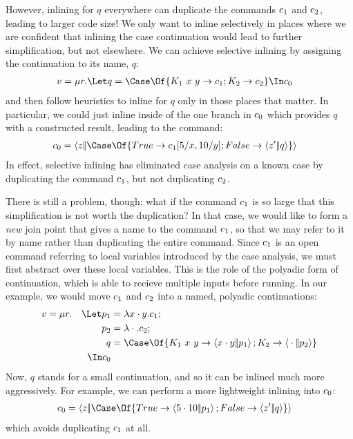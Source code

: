 \documentclass{article}
\begin{document}
However, inlining for $q$ everywhere can duplicate the commands $c_1$ and
$c_2$, leading to larger code size!  We only want to inline selectively in
places where we are confident that inlining the case continuation would lead to
further simplification, but not elsewhere.  We can achieve selective inlining by
assigning the continuation to its name, $q$:
\begin{align*}
  v
  &=
  \comp{r}
  \Let q = \Case\Of \{ K_1 ~ x ~ y \to \com_1; K_2 \to \com_2 \}
  \In \com_0
\end{align*}
and then follow heuristics to inline for $q$ only in those places that matter.
In particular, we could just inline inside of the one branch in $c_0$ which
provides $q$ with a constructed result, leading to the command:
\begin{align*}
  \com_0
  &=
  \cut{z}{\Case\Of \{ True \to \com_1[5/x,10/y]; False \to \cut{z'}{q} \}}
\end{align*}
In effect, selective inlining has eliminated case analysis on a known case by
duplicating the command $c_1$, but not duplicating $c_2$.

There is still a problem, though: what if the command $c_1$ is so large that
this simplification is not worth the duplication?  In that case, we would like
to form a \emph{new} join point that gives a name to the command $c_1$, so
that we may refer to it by name rather than duplicating the entire command.
Since $c_1$ is an open command referring to local variables introduced by the
case analysis, we must first abstract over these local variables.  This is the
role of the polyadic form of continuation, which is able to recieve multiple
inputs before running.  In our example, we would move $c_1$ and $c_2$ into
a named, polyadic continuations:
\begin{gather*}
\begin{aligned}
  v
  &=
  \comp{r}
  &
    \Let
      p_1 &= \fnk{\pack{x}{y}} \com_1;
  \\
  &&
      p_2 &= \fnk{\packs{}{}} \com_2;
  \\
  &&
      q &= \Case\Of \{
          K_1 ~ x ~ y \to \cut{\pack{x}{y}}{p_1};
          K_2 \to \cut{\packs{}{}}{p_2}
          \}
  \\
  &&
    \In
    \com_0
\end{aligned}
\end{gather*}
Now, $q$ stands for a small continuation, and so it can be inlined much more
aggressively.  For example, we can perform a more lightweight inlining into
$c_0$:
\begin{align*}
  \com_0
  &=
  \cut{z}{\Case\Of \{ True \to \cut{\pack{5}{10}}{p_1}; False \to \cut{z'}{q} \}}
\end{align*}
which avoids duplicating $c_1$ at all.
\end{document}
